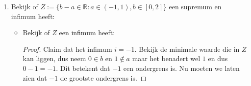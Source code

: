 \documentclass{article}
\newcommand{\f}[2]{\frac{#1}{#2}}
\newcommand{\tx}[1]{\text{#1}}
\newcommand{\R}{\mathbb{R}}
\begin{document}
\begin{enumerate}[label=\arabic*]
\begin{enumerate}[label=\alph*)]
\begin{enumerate}
\begin{itemize}
\begin{proof}
                                                      Nu moeten we nog laten zien dat het de grootste ondergrens is.
                                                      Voor alle $\epsilon > 0$, bestaat er een $x \in Y$ zodanig dat:
                                                      \[\epsilon + \underbrace{1}_{\tx{Onze claim } i = 1} > x \]
                                                      neem $x = 1 + \f{1}{n+1}$, dan:
                                                      \[\epsilon + 1 > \f{1}{n+1} + 1\]
                                                      We kunnen epsilon willekeurig klein maken en met name $\epsilon > \f{1}{n+1}$,
                                                      en dus volgt dat $i = 1$ inderdaad het infimum is.
                                                \end{proof}
                                          \item Bekijk of $Y$ een supremum heeft:
                                                \begin{proof}
                                                      Claim dat het supremum $s = 2$.
                                                      Bekijk $x \in 1 + \f{1}{n+1}$, we kunnen dit zien als
                                                      een strikt dalende functie en dus geldt voor $n=0$, dat
                                                      dit de grootste waarde is voor $1 + \f{1}{n+1}$.
                                                      En dus $1 + \f{1}{0+1} = 2$. Dit betekent dus dat $2$ het maximum van $Y$ is en dus
                                                      automatisch het supremum.
                                                \end{proof}
                                    \end{itemize}
                                    \pagebreak
                              \item Bekijk of $Z:= \{b-a \in \R : a\in (-1, 1), b \in [0, 2]\}$ een supremum en infimum heeft:
                                    \begin{itemize}
                                          \item Bekijk of $Z$ een infimum heeft:
                                                \begin{proof}
                                                      Claim dat het infimum $i = -1$.
                                                      Bekijk de minimale waarde die in $Z$ kan liggen, dus neem
                                                      $0 \in b$ en $1 \notin a$ maar het benadert wel $1$ en dus $0 - 1 = -1$.
                                                      Dit betekent dat $-1$ een ondergrens is.
                                                      Nu moeten we laten zien dat $-1$ de grootste ondergrens is.


\end{proof}
\end{itemize}
\end{enumerate}
\end{enumerate}
\end{enumerate}
\end{document}

